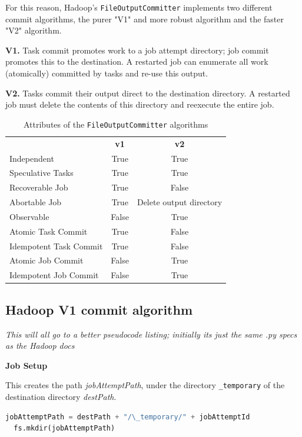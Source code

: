 \documentclass[conference]{IEEEtran}
\begin{document}
For this reason, Hadoop's \texttt{FileOutputCommitter} implements two
different commit algorithms, the purer "V1" and more robust algorithm and the
faster "V2" algorithm.


\textbf{V1.}
Task commit promotes work to a job attempt directory;
job commit promotes this to the destination.
A restarted job can enumerate all work (atomically)
committed by tasks and re-use this output.

\textbf{V2.}
Tasks commit their output direct to the destination directory.
A restarted job must delete the contents of this directory and reexecute
the entire job.

\begin{table}
  \caption{Attributes of the \texttt{FileOutputCommitter} algorithms}
  \begin{tabular}{ l c c }
    \hline
    & \textbf{v1} & \textbf{v2} \\
    Independent & True & True \\
    Speculative Tasks & True & True \\
    Recoverable Job & True & False \\
    Abortable Job & True & Delete output directory \\
    Observable & False & True \\
    Atomic Task Commit & True & False \\
    Idempotent Task Commit & True & False \\
    Atomic Job Commit & False & True \\
    Idempotent Job Commit & False & True \\
    \hline
  \end{tabular}
  \label{tab:file-committer-attributes}
\end{table}


\subsection{Hadoop V1 commit algorithm}


\emph{This will all go to a better pseudocode listing;
initially its just the same .py specs as the Hadoop docs}

\textbf{Job Setup}

This creates the path \emph{jobAttemptPath}, under the
directory \texttt{\_temporary} of the destination directory
\emph{destPath}.

\begin{lstlisting}[language=Python]
  jobAttemptPath = destPath + "/\_temporary/" + jobAttemptId
  fs.mkdir(jobAttemptPath)
\end{lstlisting}
\end{document}
